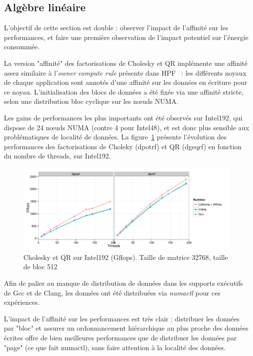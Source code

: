 \documentclass[parallelisme]{compas2017}
\begin{document}
\subsection{Algèbre linéaire}

L'objectif de cette section est double : observer l'impact de l'affinité sur les
performances, et faire une première observation de l'impact potentiel sur
l'énergie consommée.

La version "affinité" des factorisations de Cholesky et QR implémente une affinité
assez similaire à l'\textit{owner compute rule} présente dans HPF~\cite{HPF} :
les différents noyaux de chaque application sont annotés d'une affinité sur
les données en écriture pour ce noyau.
L'initialisation des blocs de données a été fixée via une affinité stricte, selon
une distribution bloc cyclique sur les nœuds NUMA.


Les gains de performances les plus importants ont été observés sur Intel192, qui
dispose de 24 nœuds NUMA (contre 4 pour Intel48), et est donc plus sensible
aux problématiques de localité de données.
La figure~\ref{fig:eval-cholesky} présente l'évolution des performances des
factorisations de Choleky (dpotrf) et QR (dgeqrf) en fonction du nombre
de threads, sur Intel192.

\begin{figure}[t]
  \centering
  \includegraphics[scale=0.6]{./graphs/graph_dpotrf.pdf}
  \caption{Cholesky et QR sur Intel192 (Gflops). Taille de matrice 32768, taille de bloc 512}
\label{fig:eval-cholesky}
\end{figure}

Afin de palier au manque de distribution de données dans les supports exécutifs
de Gcc et de Clang, les données ont été distribuées via \textit{numactl} pour
ces expériences.

L'impact de l'affinité sur les performances est très clair : distribuer les données
par "bloc" et assurer un ordonnancement hiérarchique au plus proche des données écrites offre
de bien meilleures performances que de distribuer les données par "page" (ce que fait
numactl), sans faire attention à la localité des données.
\end{document}
